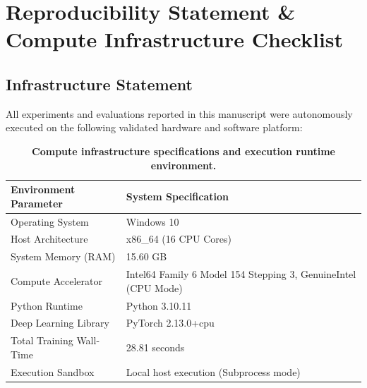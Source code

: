 \documentclass[10pt,twocolumn]{article}
\begin{document}
\section{Reproducibility Statement \& Compute Infrastructure Checklist}
\subsection{Infrastructure Statement}
All experiments and evaluations reported in this manuscript were autonomously executed on the following validated hardware and software platform:

\begin{table}[t]
\centering
\caption{\textbf{Compute infrastructure specifications and execution runtime environment.}}
\begin{tabular}{ll}
\toprule
\textbf{Environment Parameter} & \textbf{System Specification} \\
\midrule
Operating System & Windows 10 \\
Host Architecture & x86\_64 (16 CPU Cores) \\
System Memory (RAM) & 15.60 GB \\
Compute Accelerator & Intel64 Family 6 Model 154 Stepping 3, GenuineIntel (CPU Mode) \\
Python Runtime & Python 3.10.11 \\
Deep Learning Library & PyTorch 2.13.0+cpu \\
Total Training Wall-Time & 28.81 seconds \\
Execution Sandbox & Local host execution (Subprocess mode) \\
\bottomrule
\end{tabular}
\label{tab:compute_environment}
\end{table}
\end{document}
